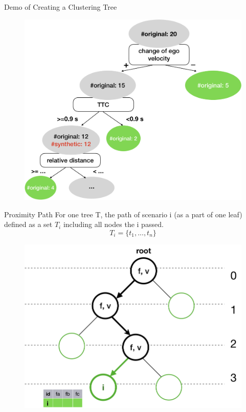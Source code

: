 \documentclass[shortpres]{beamer}
\begin{document}
  \begin{frame}{Demo of Creating a Clustering Tree}	
    \begin{figure}
      \includegraphics[height=0.6\textheight]{fig/cltree4.png}
    \end{figure}
  \end{frame}
  \begin{frame}{Proximity Path}	
    For one tree T, the path of scenario i (as a part of one leaf) defined as a set $T_i$ including all nodes the i passed.
    $$T_i = \{t_1,...,t_n\}$$
    \begin{figure}
      \includegraphics[height=0.6\textheight]{fig/ppath.png}
    \end{figure}
  \end{frame}
\end{document}
